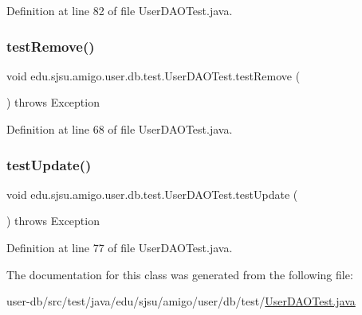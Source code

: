 Definition at line 82 of file User\+D\+A\+O\+Test.\+java.

\mbox{\label{classedu_1_1sjsu_1_1amigo_1_1user_1_1db_1_1test_1_1_user_d_a_o_test_a0e178e2bb5b301bf56ad74a604c58908}} 
\subsubsection{\texorpdfstring{test\+Remove()}{testRemove()}}
{\footnotesize\ttfamily void edu.\+sjsu.\+amigo.\+user.\+db.\+test.\+User\+D\+A\+O\+Test.\+test\+Remove (\begin{DoxyParamCaption}{ }\end{DoxyParamCaption}) throws Exception}



Definition at line 68 of file User\+D\+A\+O\+Test.\+java.

\mbox{\label{classedu_1_1sjsu_1_1amigo_1_1user_1_1db_1_1test_1_1_user_d_a_o_test_a8bd1ecf63b75dfb919536d80f18a938e}} 
\subsubsection{\texorpdfstring{test\+Update()}{testUpdate()}}
{\footnotesize\ttfamily void edu.\+sjsu.\+amigo.\+user.\+db.\+test.\+User\+D\+A\+O\+Test.\+test\+Update (\begin{DoxyParamCaption}{ }\end{DoxyParamCaption}) throws Exception}



Definition at line 77 of file User\+D\+A\+O\+Test.\+java.



The documentation for this class was generated from the following file\+:\begin{DoxyCompactItemize}
\item 
user-\/db/src/test/java/edu/sjsu/amigo/user/db/test/\hyperlink{_user_d_a_o_test_8java}{User\+D\+A\+O\+Test.\+java}\end{DoxyCompactItemize}
